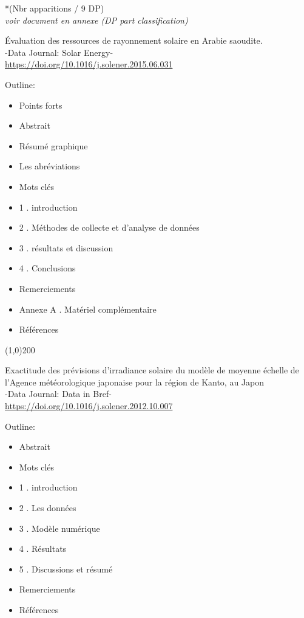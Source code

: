 \documentclass[11pt,oneside]{article}
\begin{document}
\begin{flushright}
*(Nbr apparitions / 9 DP)\\
{\small \textit{voir document en annexe (DP part classification) }}\\
\end{flushright}
\newpage

\twocolumn
\setlength{\columnseprule}{0.01cm}
\begin{center}
Évaluation des ressources de rayonnement solaire en Arabie saoudite.\\
-Data Journal: Solar Energy-\\
\url {https://doi.org/10.1016/j.solener.2015.06.031}
\end{center}

\noindent Outline:
\begin{itemize}
\item Points forts
\item Abstrait
\item Résumé graphique
\item Les abréviations
\item Mots clés
\item 1 . introduction
\item 2 . Méthodes de collecte et d'analyse de données
\item 3 . résultats et discussion
\item 4 . Conclusions
\item Remerciements
\item Annexe A . Matériel complémentaire
\item Références
\end{itemize}

\line (1,0){200}

\begin{center}
Exactitude des prévisions d'irradiance solaire du modèle de moyenne échelle de l'Agence météorologique japonaise pour la région de Kanto, au Japon\\
-Data Journal: Data in Bref-\\
\url {https://doi.org/10.1016/j.solener.2012.10.007}
\end{center}
\noindent Outline:
\begin{itemize}
\item Abstrait
\item Mots clés
\item 1 . introduction
\item 2 . Les données
\item 3 . Modèle numérique
\item 4 . Résultats
\item 5 . Discussions et résumé
\item Remerciements
\item Références
\end{itemize}
\end{document}
